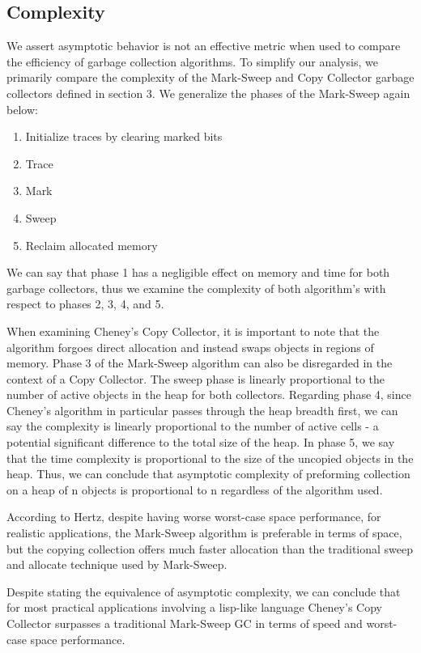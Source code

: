 \documentclass[11pt,leqno]{article}
\begin{document}
\subsection{Complexity}
We assert asymptotic behavior is not an effective metric when used to compare the efficiency of garbage collection algorithms. To simplify our analysis, we primarily compare the complexity of the Mark-Sweep and Copy Collector garbage collectors defined in section 3. We generalize the phases of the Mark-Sweep again below:
\begin{enumerate}
  \item Initialize traces by clearing marked bits
  \item Trace
  \item Mark
  \item Sweep
  \item Reclaim allocated memory
\end{enumerate}
We can say that phase 1 has a negligible effect on memory and time for both garbage collectors, thus we examine the complexity of both algorithm's with respect to phases 2, 3, 4, and 5.

When examining Cheney's Copy Collector, it is important to note that the algorithm forgoes direct allocation and instead swaps objects in regions of memory\cite{hertz}. Phase 3 of the Mark-Sweep algorithm can also be disregarded in the context of a Copy Collector. The sweep phase is linearly proportional to the number of active objects in the heap for both collectors.
Regarding phase 4, since Cheney's algorithm in particular passes through the heap breadth first, we can say the complexity is linearly proportional to the number of active cells - a potential significant difference to the total size of the heap. In phase 5, we say that the time complexity is proportional to the size of the uncopied objects in the heap. Thus, we can conclude that asymptotic complexity of preforming collection on a heap of n objects is proportional to n regardless of the algorithm used.

According to Hertz, despite having worse worst-case space performance, for realistic applications, the Mark-Sweep algorithm is preferable in terms of space, but the copying collection offers much faster allocation than the traditional sweep and allocate technique used by Mark-Sweep.\cite{hertz}

Despite stating the equivalence of asymptotic complexity, we can conclude that for most practical applications involving a lisp-like language Cheney's Copy Collector surpasses a traditional Mark-Sweep GC in terms of speed and worst-case space performance.
\end{document}
